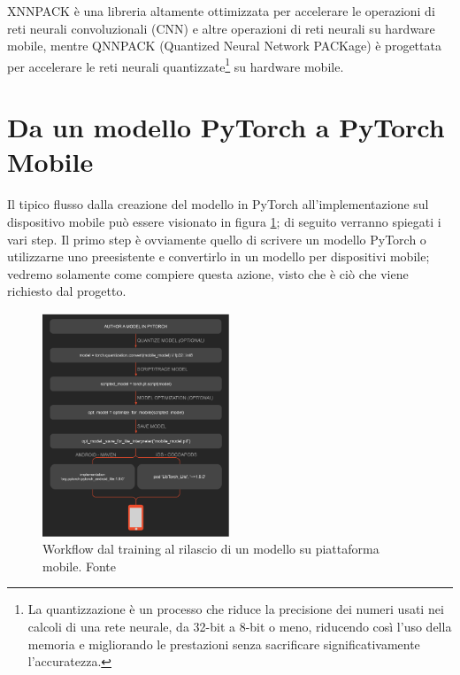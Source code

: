 XNNPACK\cite{XNNPACK} è una libreria altamente ottimizzata per accelerare le operazioni di reti neurali convoluzionali (CNN) e altre operazioni di reti neurali su hardware mobile,
mentre QNNPACK\cite{QNNPACK} (Quantized Neural Network PACKage) è progettata per accelerare le reti neurali quantizzate\footnote{La quantizzazione è un processo che riduce la precisione dei numeri usati nei calcoli di una rete neurale, da 32-bit a 8-bit o meno, riducendo così l'uso della memoria e migliorando le prestazioni senza sacrificare significativamente l'accuratezza.}
su hardware mobile.


\section{Da un modello PyTorch a PyTorch Mobile}
Il tipico flusso dalla creazione del modello in PyTorch all'implementazione sul dispositivo mobile può essere visionato in figura \ref{fig:pyworkflow}; di seguito
verranno spiegati i vari step. Il primo step è ovviamente quello di scrivere un modello PyTorch o utilizzarne uno preesistente e convertirlo in un modello per dispositivi mobile; vedremo
solamente come compiere questa azione, visto che è ciò che viene richiesto dal progetto.

\begin{figure}[ht]
    \centering
    \includegraphics[width=0.5\textwidth]{Immagini/workflow_pytorch.png}
    \caption{Workflow dal training al rilascio di un modello su piattaforma mobile. Fonte \cite{PyTorchOfficial}}
    \label{fig:pyworkflow}
\end{figure}

